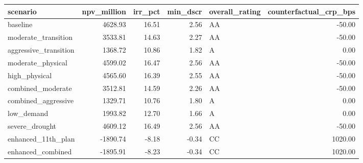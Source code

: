 \begin{tabular}{lrrrlr}
\toprule
scenario & npv_million & irr_pct & min_dscr & overall_rating & counterfactual_crp_bps \\
\midrule
baseline & 4628.93 & 16.51 & 2.56 & AA & -50.00 \\
moderate_transition & 3533.81 & 14.63 & 2.27 & AA & -50.00 \\
aggressive_transition & 1368.72 & 10.86 & 1.82 & A & 0.00 \\
moderate_physical & 4599.02 & 16.47 & 2.56 & AA & -50.00 \\
high_physical & 4565.60 & 16.39 & 2.55 & AA & -50.00 \\
combined_moderate & 3512.81 & 14.59 & 2.26 & AA & -50.00 \\
combined_aggressive & 1329.71 & 10.76 & 1.80 & A & 0.00 \\
low_demand & 1993.82 & 12.70 & 1.66 & A & 0.00 \\
severe_drought & 4609.12 & 16.49 & 2.56 & AA & -50.00 \\
enhanced_11th_plan & -1890.74 & -8.18 & -0.34 & CC & 1020.00 \\
enhanced_combined & -1895.91 & -8.23 & -0.34 & CC & 1020.00 \\
\bottomrule
\end{tabular}
